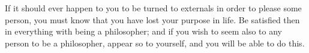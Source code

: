 If it should  ever happen to you to  be turned to externals in  order to please
some  person, you  must  know that  you  have  lost your  purpose  in life.  Be
satisfied then in everything with being a  philosopher; and if you wish to seem
also to any person to be a philosopher,  appear so to yourself, and you will be
able to do this.
